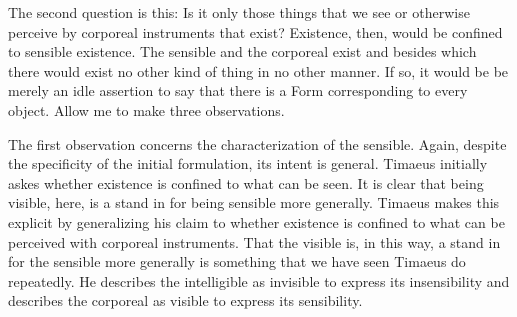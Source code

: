 
The second question is this: Is it only those things that we see or otherwise perceive by corporeal instruments that exist? Existence, then, would be confined to sensible existence. The sensible and the corporeal exist and besides which there would exist no other kind of thing in no other manner. If so, it would be be merely an idle assertion to say that there is a Form corresponding to every object. Allow me to make three observations.

The first observation concerns the characterization of the sensible. Again, despite the specificity of the initial formulation, its intent is general. Timaeus initially askes whether existence is confined to what can be seen. It is clear that being visible, here, is a stand in for being sensible more generally. Timaeus makes this explicit by generalizing his claim to whether existence is confined to what can be perceived with corporeal instruments. That the visible is, in this way, a stand in for the sensible more generally is something that we have seen Timaeus do repeatedly. He describes the intelligible as invisible to express its insensibility and describes the corporeal as visible to express its sensibility. 


